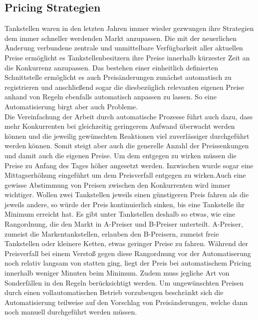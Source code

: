 \documentclass[12pt,a4paper,bibliography=totocnumbered,listof=totocnumbered]{scrartcl}
\begin{document}
\subsection{Pricing Strategien}
Tankstellen waren in den letzten Jahren immer wieder gezwungen ihre Strategien dem immer schneller werdenden Markt anzupassen. Die mit der neuerlichen Änderung verbundene zentrale und unmittelbare Verfügbarkeit aller aktuellen Preise ermöglicht es Tankstellenbesitzern ihre Preise innerhalb kürzester Zeit an die Konkurrenz anzupassen. Das bestehen einer einheitlich definierten Schnittstelle ermöglicht es auch Preisänderungen zunächst automatisch zu registrieren und anschließend sogar die diesbezüglich relevanten eigenen Preise anhand von Regeln ebenfalls automatisch anpassen zu lassen. So eine Automatisierung birgt aber auch Probleme.\\
Die Vereinfachung der Arbeit durch automatische Prozesse führt auch dazu, dass mehr Konkurrenten bei gleichzeitig geringerem Aufwand überwacht werden können und die jeweilig gewünschten Reaktionen viel zuverlässiger durchgeführt werden können. Somit steigt aber auch die generelle Anzahl der Preissenkungen und damit auch die eigenen Preise. Um dem entgegen zu wirken müssen die Preise zu Anfang des Tages höher angesetzt werden. Inzwischen wurde sogar eine Mittagserhöhung eingeführt um dem Preisverfall entgegen zu wirken.Auch eine gewisse Abstimmung von Preisen zwischen den Konkurrenten wird immer wichtiger. Wollen zwei Tankstellen jeweils einen günstigeren Preis fahren als die jeweils andere, so würde der Preis kontinuierlich sinken, bis eine Tankstelle ihr Minimum erreicht hat. Es gibt unter Tankstellen deshalb so etwas, wie eine Rangordnung, die den Markt in A-Preiser und B-Preiser unterteilt. A-Preiser, zumeist die Markentankstellen, erlauben den B-Preisern, zumeist freie Tankstellen oder kleinere Ketten, etwas geringer Preise zu fahren. Während der Preisverfall bei einem Verstoß gegen diese Rangordnung vor der Automatiserung noch relativ langsam von statten ging, liegt der Preis bei automatischem Pricing innerhalb weniger Minuten beim Minimum. Zudem muss jegliche Art von Sonderfällen in den Regeln berücksichtigt werden. Um ungewünschten Preisen durch einen vollautomatischen Betrieb vorzubeugen beschränkt sich die Automatisierung teilweise auf den Vorschlag von Preisänderungen, welche dann noch manuell durchgeführt werden müssen.\\

\end{document}
